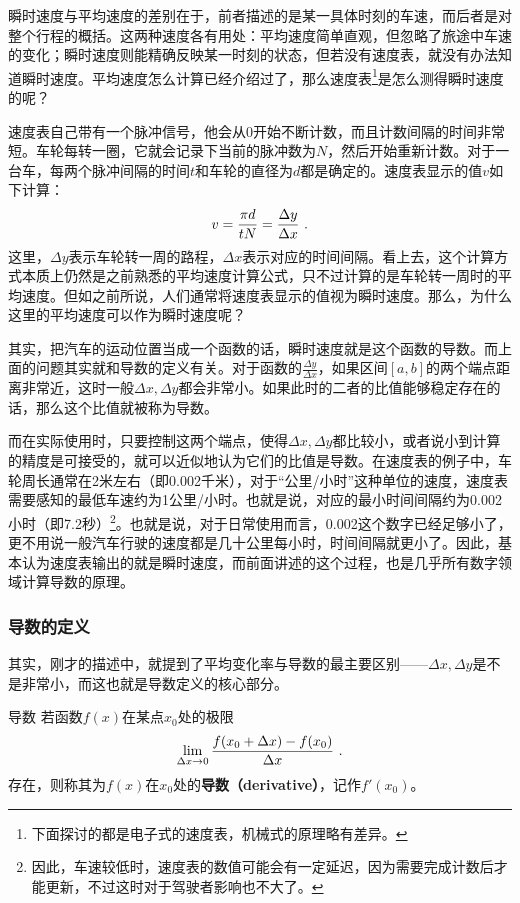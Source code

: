 瞬时速度与平均速度的差别在于，前者描述的是某一具体时刻的车速，而后者是对整个行程的概括。这两种速度各有用处：平均速度简单直观，但忽略了旅途中车速的变化；瞬时速度则能精确反映某一时刻的状态，但若没有速度表，就没有办法知道瞬时速度。平均速度怎么计算已经介绍过了，那么速度表\footnote{下面探讨的都是电子式的速度表，机械式的原理略有差异。}是怎么测得瞬时速度的呢？

速度表自己带有一个脉冲信号，他会从0开始不断计数，而且计数间隔的时间非常短。车轮每转一圈，它就会记录下当前的脉冲数为$N$，然后开始重新计数。对于一台车，每两个脉冲间隔的时间$t$和车轮的直径为$d$都是确定的。速度表显示的值$v$如下计算：
\begin{equation}
v={\pi d\over tN}=\frac{\Delta y}{\Delta x}~.
\end{equation}
这里，$\Delta y$表示车轮转一周的路程，$\Delta x$表示对应的时间间隔。看上去，这个计算方式本质上仍然是之前熟悉的平均速度计算公式，只不过计算的是车轮转一周时的平均速度。但如之前所说，人们通常将速度表显示的值视为瞬时速度。那么，为什么这里的平均速度可以作为瞬时速度呢？

其实，把汽车的运动位置当成一个函数的话，瞬时速度就是这个函数的导数。而上面的问题其实就和导数的定义有关。对于函数的$\displaystyle\frac{\Delta y}{\Delta x}$，如果区间$[a, b]$的两个端点距离非常近，这时一般$\Delta x,\Delta y$都会非常小。如果此时的二者的比值能够稳定存在的话，那么这个比值就被称为导数。

而在实际使用时，只要控制这两个端点，使得$\Delta x,\Delta y$都比较小，或者说小到计算的精度是可接受的，就可以近似地认为它们的比值是导数。在速度表的例子中，车轮周长通常在2米左右（即0.002千米），对于“公里/小时”这种单位的速度，速度表需要感知的最低车速约为1公里/小时。也就是说，对应的最小时间间隔约为0.002小时（即7.2秒）\footnote{因此，车速较低时，速度表的数值可能会有一定延迟，因为需要完成计数后才能更新，不过这时对于驾驶者影响也不大了。}。也就是说，对于日常使用而言，0.002这个数字已经足够小了，更不用说一般汽车行驶的速度都是几十公里每小时，时间间隔就更小了。因此，基本认为速度表输出的就是瞬时速度，而前面讲述的这个过程，也是几乎所有数字领域计算导数的原理。

\subsubsection{导数的定义}

其实，刚才的描述中，就提到了平均变化率与导数的最主要区别——$\Delta x,\Delta y$是不是非常小，而这也就是导数定义的核心部分。

\begin{definition}{导数}
若函数$f(x)$在某点$x_0$处的极限
\begin{equation}
\lim_{\Delta x\to 0}{f(x_0+\Delta x)-f(x_0)\over \Delta x}~.
\end{equation}
存在，则称其为$f(x)$在$x_0$处的\textbf{导数（derivative）}，记作$f'(x_0)$。
\end{definition}

